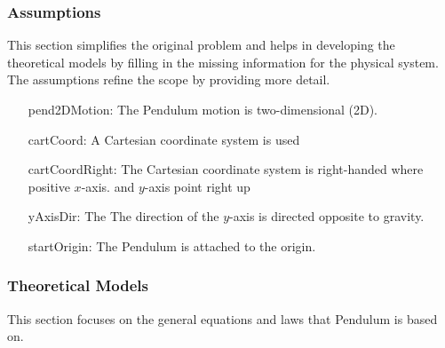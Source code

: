 \documentclass[12pt]{article}
\begin{document}
\subsubsection{Assumptions}
\label{Sec:Assumps}
This section simplifies the original problem and helps in developing the theoretical models by filling in the missing information for the physical system. The assumptions refine the scope by providing more detail.

\begin{itemize}
\item[pend2DMotion:\phantomsection\label{pend2DMotion}]{The Pendulum motion is two-dimensional (2D).}
\item[cartCoord:\phantomsection\label{cartCoord}]{A Cartesian coordinate system is used}
\item[cartCoordRight:\phantomsection\label{cartCoordRight}]{The Cartesian coordinate system is right-handed where positive $x$-axis. and $y$-axis point right up}
\item[yAxisDir:\phantomsection\label{yAxisDir}]{The The direction of the $y$-axis is directed opposite to gravity.}
\item[startOrigin:\phantomsection\label{startOrigin}]{The Pendulum is attached to the origin.}
\end{itemize}
\subsubsection{Theoretical Models}
\label{Sec:TMs}
This section focuses on the general equations and laws that Pendulum is based on.
\end{document}
